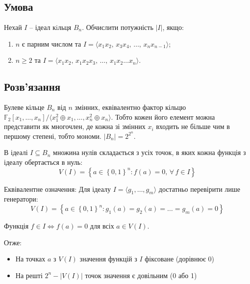 \chapter{}
\label{chap:2}

\section{Умова}
Нехай $I$ -- ідеал кiльця $B_{n}$. Обчислити потужність $\left| I\right|$, якщо:
\begin{enumerate}[label=\alph*)]
    \item $n$ є парним числом та $I = \langle x_{1}x_{2}, \, x_{3}x_{4}, \, \ldots, \, x_{n}x_{n-1} \rangle$;
    \item $n \geq 2$ та $I = \langle x_{1}x_{2}, \, x_{1}x_{2}x_{3}, \, \ldots , \, x_{1}x_{2} \ldots x_{n}\rangle$.
\end{enumerate}

\section{Розв'язання}

Булеве кільце $B_{n}$ від $n$ змінних, еквівалентно фактор кільцю $\mathbb{F}_2[x_1, \ldots, x_n] / \langle x_1^2 \oplus x_1, \ldots, x_n^2 \oplus x_n \rangle$. 
Тобто кожен його елемент можна представити як многочлен, де кожна зі змінних $x_{i}$ входить не більше чим в першому 
степені, тобто мономи. $\left|B_{n}\right| = 2^{2^{n}}$.

В ідеалі $I \subseteq B_n$ множина нулів складається з усіх точок, в яких кожна функція з ідеалу обертається в нуль:
\begin{equation*}
    V(I) = \left\{a \in \left\{0,1\right\}^n : f(a) = 0, \, \forall \, f \in I\right\}
\end{equation*}

Еквівалентне означення: Для ідеалу $I = \langle g_1, \ldots, g_m \rangle$ достатньо перевірити лише генератори:
\begin{equation*}
    V(I) = \left\{a \in \left\{0,1\right\}^n : g_1(a) = g_2(a) = \ldots = g_m(a) = 0\right\}
\end{equation*}

\noindent Функція $f \in I \Leftrightarrow f(a) = 0$ для всіх $a \in V(I)$.

Отже:
\begin{itemize}
    \item На точках $a$ з $V(I)$ значення функцій з $I$ фіксоване (дорівнює 0)
    \item На решті $2^n - |V(I)|$ точок значення є довільним (0 або 1)
\end{itemize}


